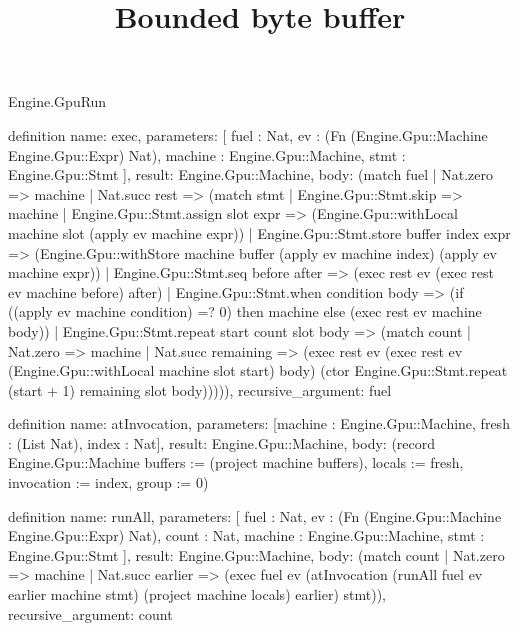 \begin{lexlean}{Engine.GpuRun}
\title{Bounded byte buffer}
\begin{semanticmodule}
definition{
  name: exec,
  parameters: [
    fuel : Nat,
    ev : (Fn (Engine.Gpu::Machine Engine.Gpu::Expr) Nat),
    machine : Engine.Gpu::Machine,
    stmt : Engine.Gpu::Stmt
  ],
  result: Engine.Gpu::Machine,
  body: (match fuel
    | Nat.zero => machine
    | Nat.succ rest => (match stmt
      | Engine.Gpu::Stmt.skip => machine
      | Engine.Gpu::Stmt.assign slot expr => (Engine.Gpu::withLocal machine slot (apply ev machine expr))
      | Engine.Gpu::Stmt.store buffer index expr => (Engine.Gpu::withStore machine buffer (apply ev machine index) (apply ev machine expr))
      | Engine.Gpu::Stmt.seq before after => (exec rest ev (exec rest ev machine before) after)
      | Engine.Gpu::Stmt.when condition body => (if ((apply ev machine condition) =? 0) then machine else (exec rest ev machine body))
      | Engine.Gpu::Stmt.repeat start count slot body => (match count
        | Nat.zero => machine
        | Nat.succ remaining => (exec rest ev (exec rest ev (Engine.Gpu::withLocal machine slot start) body) (ctor Engine.Gpu::Stmt.repeat (start + 1) remaining slot body))))),
  recursive_argument: fuel
}

definition{
  name: atInvocation,
  parameters: [machine : Engine.Gpu::Machine, fresh : (List Nat), index : Nat],
  result: Engine.Gpu::Machine,
  body: (record Engine.Gpu::Machine {buffers := (project machine buffers), locals := fresh, invocation := index, group := 0})
}

definition{
  name: runAll,
  parameters: [
    fuel : Nat,
    ev : (Fn (Engine.Gpu::Machine Engine.Gpu::Expr) Nat),
    count : Nat,
    machine : Engine.Gpu::Machine,
    stmt : Engine.Gpu::Stmt
  ],
  result: Engine.Gpu::Machine,
  body: (match count
    | Nat.zero => machine
    | Nat.succ earlier => (exec fuel ev (atInvocation (runAll fuel ev earlier machine stmt) (project machine locals) earlier) stmt)),
  recursive_argument: count
}
\end{semanticmodule}
\end{lexlean}
